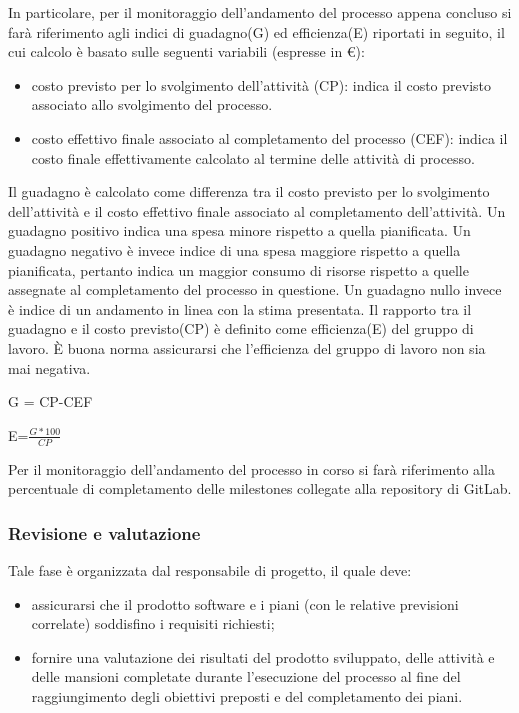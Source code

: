 In particolare, per il monitoraggio dell'andamento del processo appena concluso si farà riferimento agli indici di guadagno(G) ed efficienza(E) riportati in seguito, il cui calcolo è basato sulle seguenti variabili (espresse in €):
\begin{itemize}
    \item costo previsto per lo svolgimento dell'attività (CP): indica il costo previsto associato allo svolgimento del processo.
    \item costo effettivo finale associato al completamento del processo (CEF): indica il costo finale effettivamente calcolato al termine delle attività di processo.
\end{itemize}
Il guadagno è calcolato come differenza tra il costo previsto per lo svolgimento dell'attività e il costo effettivo finale associato al completamento dell'attività. Un guadagno positivo indica una spesa minore rispetto a quella pianificata. Un guadagno negativo è invece indice di una spesa maggiore rispetto a quella pianificata, pertanto indica un maggior consumo di risorse rispetto a quelle assegnate al completamento del processo in questione. Un guadagno nullo invece è indice di un andamento in linea con la stima presentata. Il rapporto tra il guadagno e il costo previsto(CP) è definito come efficienza(E) del gruppo di lavoro. È buona norma assicurarsi che l'efficienza del gruppo di lavoro non sia mai negativa.
\begin{center}
    G = CP-CEF

    E=$\frac{G*100}{CP}$   
\end{center}


Per il monitoraggio dell'andamento del processo in corso si farà riferimento alla percentuale di completamento delle  milestones collegate alla repository di GitLab.

\subsubsection{Revisione e valutazione}
Tale fase è organizzata dal responsabile di progetto, il quale deve:
\begin{itemize}
    \item  assicurarsi che il prodotto software e i piani (con le relative previsioni correlate) soddisfino i requisiti richiesti;
    \item  fornire una valutazione dei risultati del prodotto sviluppato, delle attività e delle mansioni completate durante l'esecuzione del processo al fine del raggiungimento degli obiettivi preposti e del completamento dei piani.
\end{itemize}

